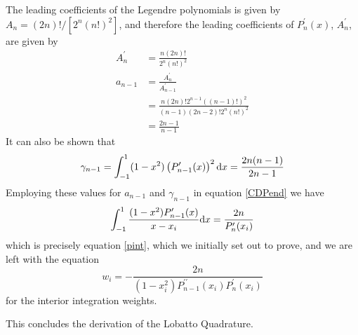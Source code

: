 The leading coefficients of the Legendre polynomials is given by $A_n=(2n)!/[2^n(n!)^2]$, and 
therefore the leading coefficients of $P_n^\prime(x)$, $A^\prime_n$, are given by  
\begin{align}
\label{Aprime}
A^\prime_n&=\frac{n(2n)!}{2^n(n!)^2} \\
a_{n-1}&=\frac{A^\prime_n}{A^\prime_{n-1}}\\
&=\frac{n(2n)!2^{n-1}((n-1)!)^2}{(n-1)(2n-2)!2^n(n!)^2} \\
&= \frac{2n-1}{n-1}
\end{align}
It can also be shown that 
\begin{equation}
\label{gammasolve}
\gamma_{n-1}=\int_{-1}^{1}(1-x^2)\left(P_{n-1}^\prime(x)\right)^2 {\rm d}x = \frac{2n(n-1)}{2n-1}
\end{equation}
Employing these values for $a_{n-1}$ and $\gamma_{n-1}$ in equation \ref{CDPend}
we have 
\begin{equation}
\int_{-1}^{1} \frac{(1-x^2)P_{n-1}^\prime(x)}{x-x_i}{\rm d}x = \frac{2n}{P_n^\prime(x_i)}
\end{equation}
which is precisely equation \ref{pint}, which we initially set out to prove, and we 
are left with the equation 
\begin{equation}
\label{weightform3}
w_i= -\frac{2n}{(1-x_i^2)P_{n-1}^{\prime\prime}(x_i)P_n^\prime(x_i)}
\end{equation}
for the interior integration weights. 

This concludes the derivation of the Lobatto Quadrature. 
